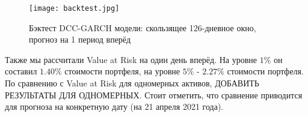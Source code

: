 \documentclass[a4paper,11pt]{article}
\begin{document}
\begin{figure}[h]
 \advance\leftskip-1.5cm
    \texttt{[image: backtest.jpg]}
    \caption{Бэктест DCC-GARCH модели: скользящее 126-дневное окно, \\ прогноз на 1 период вперёд }
    \label{fig:backtest}
\end{figure}

Также мы рассчитали Value at Risk на один день вперёд. На уровне $1\%$ он составил $1.40\%$ стоимости портфеля, на уровне $5\%$ - $2.27\%$ стоимости портфеля. По сравнению с Value at Risk для одномерных активов, ДОБАВИТЬ РЕЗУЛЬТАТЫ ДЛЯ ОДНОМЕРНЫХ. Стоит отметить, что сравнение приводится для прогноза на конкретную дату (на 21 апреля 2021 года).
\end{document}
